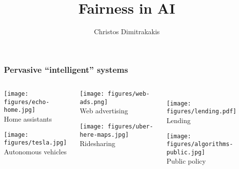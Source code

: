 \documentclass{beamer}
\title{Fairness in AI}
\author[C. Dimitrakakis]{Christos Dimitrakakis}
\begin{document}
\begin{frame}
  \titlepage
\end{frame}
\usebackgroundtemplate{}


\begin{frame}
  \frametitle{Pervasive ``intelligent'' systems}
  \begin{columns}
    \begin{column}{0.3\textwidth}
      \centering
      \texttt{[image: figures/echo-home.jpg]}
      \\
      Home assistants

      \vspace{\fill}

      \bigskip

      \texttt{[image: figures/tesla.jpg]}
      \\
      Autonomous vehicles
    \end{column}
    \begin{column}{0.3\textwidth}
      \centering 
      \texttt{[image: figures/web-ads.png]}
      \\
      Web advertising

      \vspace{\fill}

      \bigskip

      \texttt{[image: figures/uber-here-maps.jpg]}
      \\
      Ridesharing
    \end{column}
    \begin{column}{0.3\textwidth}
      \centering 
      \\
      \texttt{[image: figures/lending.pdf]}
      \\
      Lending

      \vspace{\fill}

      \bigskip

      \texttt{[image: figures/algorithms-public.jpg]}
      \\
      Public policy
    \end{column}
  \end{columns}
\end{frame}

\end{document}
